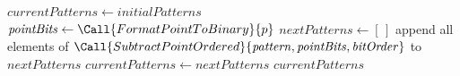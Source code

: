 \begin{algorithm}[t]
\begin{algorithmic}[1]
    \State $\mathit{currentPatterns} \gets \mathit{initialPatterns}$
        \State $\mathit{pointBits} \gets \Call{FormatPointToBinary}{p}$
        \State $\mathit{nextPatterns} \gets [\,]$
            \State append all elements of $\Call{SubtractPointOrdered}{\mathit{pattern}, \mathit{pointBits}, \mathit{bitOrder}}$ to $\mathit{nextPatterns}$
        \EndFor
        \State $\mathit{currentPatterns} \gets \mathit{nextPatterns}$
    \EndFor
    \State \Return $\mathit{currentPatterns}$
\EndProcedure
\end{algorithmic}
\end{algorithm}

